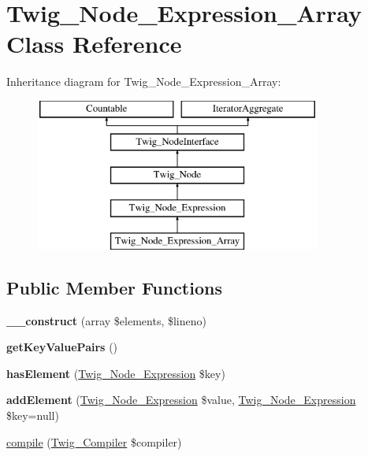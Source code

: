 \hypertarget{class_twig___node___expression___array}{}\section{Twig\+\_\+\+Node\+\_\+\+Expression\+\_\+\+Array Class Reference}
\label{class_twig___node___expression___array}
Inheritance diagram for Twig\+\_\+\+Node\+\_\+\+Expression\+\_\+\+Array\+:\begin{figure}[H]
\begin{center}
\leavevmode
\includegraphics[height=5.000000cm]{class_twig___node___expression___array}
\end{center}
\end{figure}
\subsection*{Public Member Functions}
\begin{DoxyCompactItemize}
\item 
\hypertarget{class_twig___node___expression___array_a393017e9ef64d4b98cc884936c4b225d}{}{\bfseries \+\_\+\+\_\+construct} (array \$elements, \$lineno)\label{class_twig___node___expression___array_a393017e9ef64d4b98cc884936c4b225d}

\item 
\hypertarget{class_twig___node___expression___array_a51b6b9e8b46cde4ba3bee149c9bb46a6}{}{\bfseries get\+Key\+Value\+Pairs} ()\label{class_twig___node___expression___array_a51b6b9e8b46cde4ba3bee149c9bb46a6}

\item 
\hypertarget{class_twig___node___expression___array_a9aa43f596dac14beee08b17c0827aecb}{}{\bfseries has\+Element} (\hyperlink{class_twig___node___expression}{Twig\+\_\+\+Node\+\_\+\+Expression} \$key)\label{class_twig___node___expression___array_a9aa43f596dac14beee08b17c0827aecb}

\item 
\hypertarget{class_twig___node___expression___array_a28a4df69551951ee00cdfb59c0a72c57}{}{\bfseries add\+Element} (\hyperlink{class_twig___node___expression}{Twig\+\_\+\+Node\+\_\+\+Expression} \$value, \hyperlink{class_twig___node___expression}{Twig\+\_\+\+Node\+\_\+\+Expression} \$key=null)\label{class_twig___node___expression___array_a28a4df69551951ee00cdfb59c0a72c57}

\item 
\hyperlink{class_twig___node___expression___array_a4e0faa87c3fae583620b84d3607085da}{compile} (\hyperlink{class_twig___compiler}{Twig\+\_\+\+Compiler} \$compiler)
\end{DoxyCompactItemize}
